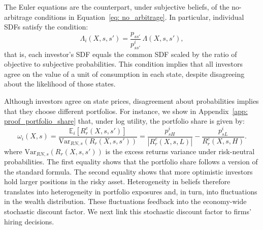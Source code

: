 
The Euler equations are the counterpart, under subjective beliefs, of the no-arbitrage
conditions in Equation~\eqref{eq: no_arbitrage}. In particular, individual SDFs satisfy the condition:
\[
\Lambda_i(X,s,s')
=
\frac{p_{ss'}}{p^i_{ss'}}\,\Lambda(X,s,s'),
\]
that is, each investor's SDF equals the common SDF scaled by the ratio of objective to subjective probabilities.
This condition implies that all investors agree on the value of a unit of consumption in each
state, despite disagreeing about the likelihood of those states.


Although investors agree on state prices, disagreement about probabilities implies that
they choose different portfolios. For instance, we show in Appendix~\ref{app: proof_portfolio_share} that, under log utility, the portfolio share is given by:
\begin{equation}
\omega_i(X,s)
=
\frac{\mathbb E_i\!\left[R_r^e(X,s,s')\right]}
{\mathrm{Var}_{RN,s}\!\left(R_r(X,s,s')\right)} = \frac{p_{sH}^i}{|R_r^e(X,s,L)|}- \frac{p_{sL}^i}{R_r^e(X,s,H)}.
\label{eq:portfolio_share}
\end{equation}\normalsize
where $\mathrm{Var}_{RN,s}\!\left(R_r(X,s,s')\right)$ is the excess returns variance under risk-neutral probabilities.
The first equality shows that the portfolio share follows a version of the standard \citet{merton1969lifetime} formula.
The second equality shows that more optimistic investors hold larger positions in the risky asset. Heterogeneity in beliefs therefore translates
into heterogeneity in portfolio exposures and, in turn, into fluctuations in the wealth
distribution. These fluctuations feedback into the economy-wide stochastic discount
factor. We next link this stochastic discount factor to firms' hiring decisions.

